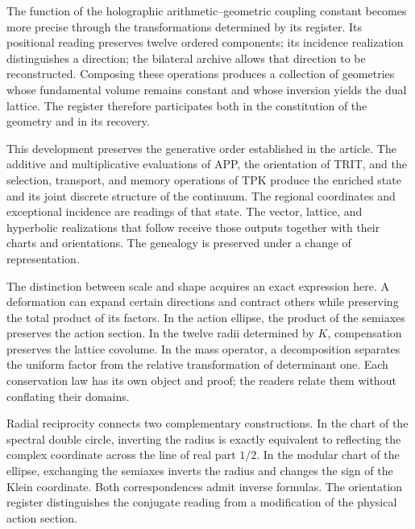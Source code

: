 \label{rec:apertura}

The function of the holographic arithmetic--geometric coupling constant becomes more precise through the transformations determined by its register. Its positional reading preserves twelve ordered components; its incidence realization distinguishes a direction; the bilateral archive allows that direction to be reconstructed. Composing these operations produces a collection of geometries whose fundamental volume remains constant and whose inversion yields the dual lattice. The register therefore participates both in the constitution of the geometry and in its recovery.

This development preserves the generative order established in the article. The additive and multiplicative evaluations of APP, the orientation of TRIT, and the selection, transport, and memory operations of TPK produce the enriched state and its joint discrete structure of the continuum. The regional coordinates and exceptional incidence are readings of that state. The vector, lattice, and hyperbolic realizations that follow receive those outputs together with their charts and orientations. The genealogy is preserved under a change of representation.

The distinction between scale and shape acquires an exact expression here. A deformation can expand certain directions and contract others while preserving the total product of its factors. In the action ellipse, the product of the semiaxes preserves the action section. In the twelve radii determined by \(K\), compensation preserves the lattice covolume. In the mass operator, a decomposition separates the uniform factor from the relative transformation of determinant one. Each conservation law has its own object and proof; the readers relate them without conflating their domains.

Radial reciprocity connects two complementary constructions. In the chart of the spectral double circle, inverting the radius is exactly equivalent to reflecting the complex coordinate across the line of real part \(1/2\). In the modular chart of the ellipse, exchanging the semiaxes inverts the radius and changes the sign of the Klein coordinate. Both correspondences admit inverse formulas. The orientation register distinguishes the conjugate reading from a modification of the physical action section.

